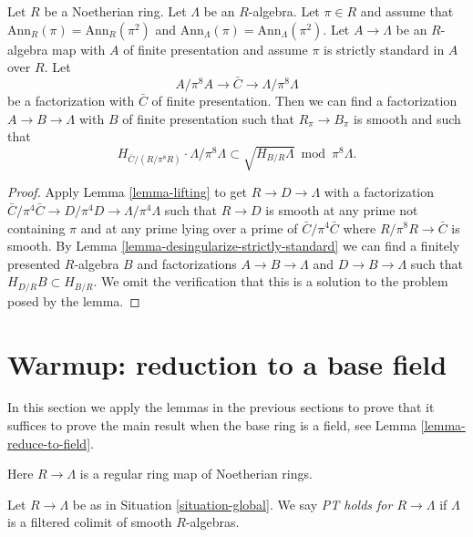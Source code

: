 \begin{lemma}
\label{lemma-desingularize-lifting-apply}
Let $R$ be a Noetherian ring. Let $\Lambda$ be an $R$-algebra.
Let $\pi \in R$ and assume that $\text{Ann}_R(\pi) = \text{Ann}_R(\pi^2)$ and
$\text{Ann}_\Lambda(\pi) = \text{Ann}_\Lambda(\pi^2)$.
Let $A \to \Lambda$ be an $R$-algebra map with
$A$ of finite presentation and assume $\pi$ is strictly standard
in $A$ over $R$. Let
$$
A/\pi^8A \to \bar C \to \Lambda/\pi^8\Lambda
$$
be a factorization with $\bar C$ of finite presentation.
Then we can find a factorization $A \to B \to \Lambda$ with $B$ of finite
presentation such that $R_\pi \to B_\pi$ is smooth and such that
$$
H_{\bar C/(R/\pi^8 R)} \cdot \Lambda/\pi^8\Lambda
\subset
\sqrt{H_{B/R} \Lambda} \bmod \pi^8\Lambda.
$$
\end{lemma}

\begin{proof}
Apply Lemma \ref{lemma-lifting} to get $R \to D \to \Lambda$
with a factorization
$\bar C/\pi^4\bar C \to D/\pi^4 D \to \Lambda/\pi^4\Lambda$
such that $R \to D$ is smooth at any prime not containing $\pi$
and at any prime lying over a prime of $\bar C/\pi^4\bar C$
where $R/\pi^8 R \to \bar C$ is smooth.
By Lemma \ref{lemma-desingularize-strictly-standard}
we can find a finitely presented $R$-algebra $B$ and
factorizations $A \to B \to \Lambda$ and $D \to B \to \Lambda$
such that $H_{D/R}B \subset H_{B/R}$. We omit the verification that
this is a solution to the problem posed by the lemma.
\end{proof}












\section{Warmup: reduction to a base field}
\label{section-reduction}

\noindent
In this section we apply the lemmas in the previous sections
to prove that it suffices to prove the main result when the base
ring is a field, see Lemma \ref{lemma-reduce-to-field}.

\begin{situation}
\label{situation-global}
Here $R \to \Lambda$ is a regular ring map of Noetherian rings.
\end{situation}

\noindent
Let $R \to \Lambda$ be as in Situation \ref{situation-global}.
We say {\it PT holds for $R \to \Lambda$} if $\Lambda$ is a
filtered colimit of smooth $R$-algebras.

